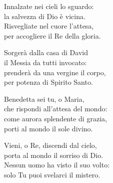 
\strofa Innalzate nei cieli lo sguardo:\\
la salvezza di Dio è vicina.\\
Risvegliate nel cuore l'attesa,\\
per accogliere il Re della gloria.

\spazio


\spazio

\strofa Sorgerà dalla casa di David\\
il Messia da tutti invocato:\\
prenderà da una vergine il corpo,\\
per potenza di Spirito Santo.

\spazio


\spazio

\strofa Benedetta sei tu, o Maria,\\
che rispondi all'attesa del mondo:\\
come aurora splendente di grazia,\\
porti al mondo il sole divino.

\spazio


\spazio

\strofa Vieni, o Re, discendi dal cielo,\\
porta al mondo il sorriso di Dio.\\
Nessun uomo ha visto il suo volto:\\
solo Tu puoi svelarci il mistero.

\spazio

